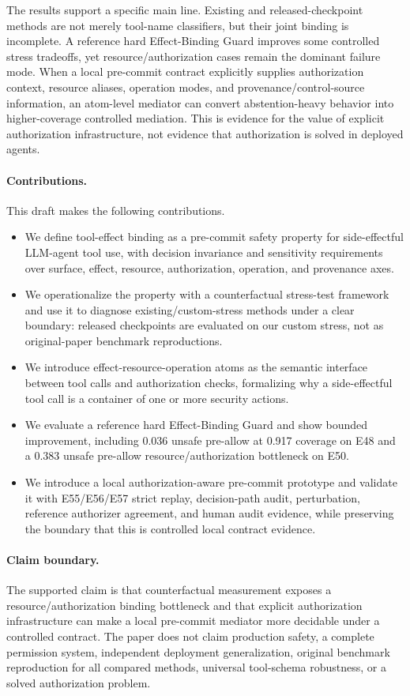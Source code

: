 

The results support a specific main line. Existing and released-checkpoint methods are not merely tool-name classifiers, but their joint binding is incomplete. A reference hard Effect-Binding Guard improves some controlled stress tradeoffs, yet resource/authorization cases remain the dominant failure mode. When a local pre-commit contract explicitly supplies authorization context, resource aliases, operation modes, and provenance/control-source information, an atom-level mediator can convert abstention-heavy behavior into higher-coverage controlled mediation. This is evidence for the value of explicit authorization infrastructure, not evidence that authorization is solved in deployed agents.

\paragraph{Contributions.}
This draft makes the following contributions.

\begin{itemize}[leftmargin=*]
\item We define tool-effect binding as a pre-commit safety property for side-effectful LLM-agent tool use, with decision invariance and sensitivity requirements over surface, effect, resource, authorization, operation, and provenance axes.
\item We operationalize the property with a counterfactual stress-test framework and use it to diagnose existing/custom-stress methods under a clear boundary: released checkpoints are evaluated on our custom stress, not as original-paper benchmark reproductions.
\item We introduce effect-resource-operation atoms as the semantic interface between tool calls and authorization checks, formalizing why a side-effectful tool call is a container of one or more security actions.
\item We evaluate a reference hard Effect-Binding Guard and show bounded improvement, including 0.036 unsafe pre-allow at 0.917 coverage on E48 and a 0.383 unsafe pre-allow resource/authorization bottleneck on E50.
\item We introduce a local authorization-aware pre-commit prototype and validate it with E55/E56/E57 strict replay, decision-path audit, perturbation, reference authorizer agreement, and human audit evidence, while preserving the boundary that this is controlled local contract evidence.
\end{itemize}

\paragraph{Claim boundary.}
The supported claim is that counterfactual measurement exposes a resource/authorization binding bottleneck and that explicit authorization infrastructure can make a local pre-commit mediator more decidable under a controlled contract. The paper does not claim production safety, a complete permission system, independent deployment generalization, original benchmark reproduction for all compared methods, universal tool-schema robustness, or a solved authorization problem.
